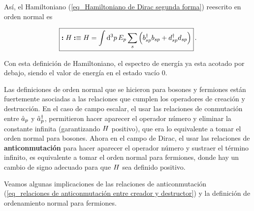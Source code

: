 Así, el Hamiltoniano (\ref{eq_Hamiltoniano de Dirac segunda forma}) reescrito en orden normal es

\begin{equation}
	\boxed{ \vb*{:} H \vb*{:} \equiv H =  \int \dd[3]{p} E_p \sum_{s} \qty\Big(  b^\dag_{sp} b_{s  p} +  d^\dag_{sp}  d_{s p}  )  } \, .
	\label{eq_Hamiltoniano campo de Dirac}
\end{equation}

Con esta definición de Hamiltoniano, el espectro de energía ya esta acotado por debajo, siendo el valor de energía en el estado vacío $0$.

\begin{cabox}
	Las definiciones de orden normal que se hicieron para bosones y fermiones están fuertemente asociadas a las relaciones que cumplen los operadores de creación y destrucción. En el caso de campo escalar, el usar las relaciones de conmutación entre $\hat{a}_p$ y $\hat{a}^\dag_p$, permitieron hacer aparecer el operador número y eliminar la constante infinita (garantizando $H$ positivo), que era lo equivalente a tomar el orden normal para bosones. Ahora en el campo de Dirac, el usar las relaciones de \textbf{anticonmutación} para hacer aparecer el operador número y sustraer el término infinito, es equivalente a tomar el orden normal para fermiones, donde hay un cambio de signo adecuado para que $H$ sea definido positivo. 
\end{cabox}

Veamos algunas implicaciones de las relaciones de anticonmutación (\ref{eq_relaciones de anticonmutación entre creador y destructor}) y la definición de ordenamiento normal para fermiones. 

